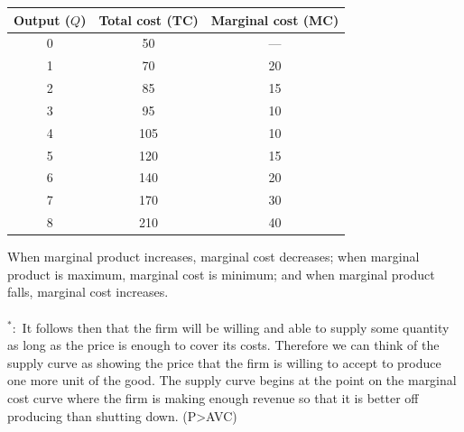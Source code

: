 \documentclass[a4paper,12pt]{article}
\begin{document}
\begin{center}
\begin{tabular}{ccc}
\toprule
\textbf{Output ($Q$)} & \textbf{Total cost (TC)} & \textbf{Marginal cost (MC)} \\
\midrule
0 & 50 & --- \\
1 & 70 & 20 \\
2 & 85 & 15 \\
3 & 95 & 10 \\
4 & 105 & 10 \\
5 & 120 & 15 \\
6 & 140 & 20 \\
7 & 170 & 30 \\
8 & 210 & 40 \\
\bottomrule
\end{tabular}
\end{center}
When marginal product increases, marginal cost decreases; when marginal product is maximum, marginal cost is minimum; and when marginal product falls, marginal cost increases.
\\\\
$^*:$ It follows then that the firm will be willing and able to supply some quantity as long as the price is enough to cover its costs. Therefore we can think of the supply
curve as showing the price that the firm is willing to accept to produce one more unit of the good. The supply curve begins at the point on the marginal cost curve where the firm is making enough revenue so that it is better off producing than shutting down. (P>AVC)

\begin{center}
\end{center}
\end{document}
